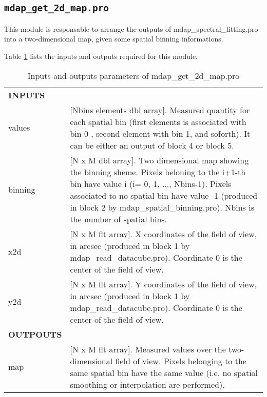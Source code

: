 \subsection{{\tt mdap\_get\_2d\_map.pro}}
\label{dap_sec:mdap_get_2d_map}

This module is responsable to arrange the outputs of
mdap\_spectral\_fitting.pro into a two-dimensional map, given some
spatial binning informations. 

Table \ref{dap_tab:mdap_get_2d_map} lists the inputs and
outputs required for this module.



\begin{center}
\begin{longtable}{p{2.7cm}| p{11.1cm}}
\caption{Inputs and outputs parameters of mdap\_get\_2d\_map.pro} \label{dap_tab:mdap_get_2d_map} \\
\hline
\endfirsthead
\hline
\endhead
\hline
\endlastfoot
\hline
{\bf  INPUTS} &  \\
%
values   &   [Nbins elements dbl array].  Measured quantity for each spatial bin (first elements is associated with bin 0 , 
            second element with bin 1, and soforth). It can be either an output of block 4 or block 5. \\
%
binning  &   [N x M dbl array]. Two dimensional map showing the binning sheme. Pixels beloning to the i+1-th 
                               bin have value i (i= 0, 1, ..., Nbins-1). Pixels associated to no spatial bin
                               have value -1 (produced in block 2 by mdap\_spatial\_binning.pro). Nbins is the number of spatial bins. \\
%
x2d      & [N x M flt array].  X coordinates of the field of view, in arcsec (produced in block 1 by mdap\_read\_datacube.pro). Coordinate 0 is the center of the field of view.\\
%
y2d      & [N x M flt array].  Y coordinates of the field of view, in arcsec (produced in block 1 by mdap\_read\_datacube.pro). Coordinate 0 is the center of the field of view.\\
%
\hline
{\bf OUTPOUTS}        &    \\
%
map      & [N x M flt array].  Measured values over the two-dimensional field of view. Pixels belonging to the same spatial bin 
                               have the same value (i.e. no spatial smoothing or interpolation are performed). \\
\hline
\end{longtable}
\end{center}

